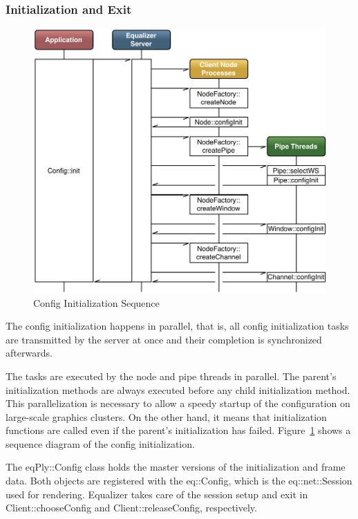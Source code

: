 \documentclass[10pt,a4]{scrartcl}
\newcommand{\fig}[1]{Figure~\ref{#1}}
\begin{document}
\subsubsection{Initialization and Exit}

\begin{figure}[ht!]\center
  \includegraphics[width=.9\textwidth]{images/configInit.pdf}
  {\caption{\small\label{fConfigInit}Config Initialization Sequence}}
\end{figure}
The config initialization happens in parallel, that is, all config
initialization tasks are transmitted by the server at once and their
completion is synchronized afterwards. 

The tasks are executed by the node and pipe threads in parallel. The
parent's initialization methods are always executed before any child
initialization method. This parallelization is necessary to allow a
speedy startup of the configuration on large-scale graphics clusters. On
the other hand, it means that initialization functions are called even
if the parent's initialization has failed. \fig{fConfigInit} shows a
sequence diagram of the config initialization.

The \textsf{eqPly::Config} class holds the master versions of the
initialization and frame data. Both objects are registered with the
\textsf{eq::Config}, which is the \textsf{eq::net::Session} used for
rendering. Equalizer takes care of the session setup and exit in
\textsf{Client::choose\-Config} and \textsf{Client::releaseConfig},
respectively.
\end{document}
